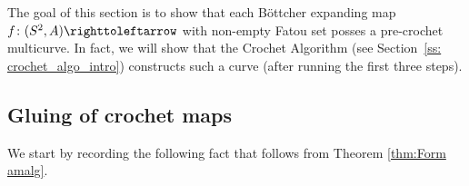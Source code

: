\documentclass{amsart}
\theoremstyle{plain}
\theoremstyle{definition}
\theoremstyle{remark}
\newcommand{\CC}{{\mathcal C}}
\newcommand{\PC}{{\mathcal P}}
\newcommand\selfmap{\righttoleftarrow}
\begin{document}

The goal of this section is to show that each B\"ottcher expanding map $f\colon (S^2,A)\selfmap$ with non-empty Fatou set posses a pre-crochet multicurve.  In fact, we will show that the Crochet Algorithm (see Section~\ref{ss: crochet_algo_intro}) constructs such a curve (after running the first three steps).  


\subsection{Gluing of crochet maps}\label{ss: gluing_crochet}
We start by recording the following fact that follows from Theorem \ref{thm:Form amalg}.
\end{document}
